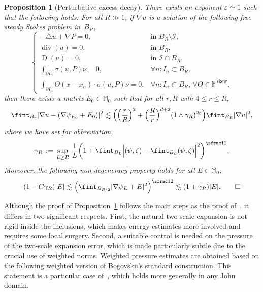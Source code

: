 \documentclass[10pt]{amsart}
\let\mathcal\mathscr
\theoremstyle{plain}
\newtheorem{propo}[theor]{Proposition}
\theoremstyle{definition}
\newcommand{\e}{\varepsilon}
\newcommand{\Ic}{\mathcal I}
\newcommand{\Md}{\mathbb M}
\newcommand{\D}{\operatorname{D}}
\newcommand{\Div}{{\operatorname{div}}}
\newcommand{\Skew}{{\operatorname{skew}}}
\begin{document}
\begin{propo}[Perturbative excess decay]\label{p1}
There exists an exponent $\e\simeq1$ such that the following holds:
For all $R\gg1$, if $\nabla u$ is a solution of the following free steady Stokes problem in~$B_R$,
\begin{equation}\label{eq:Stokes-zero}
\begin{cases}
-\triangle u+\nabla P=0,&\text{in $B_R\setminus\Ic$},\\
\Div(u)=0,&\text{in $B_R$},\\
\D(u)=0,&\text{in $\Ic\cap B_R$},\\
\int_{\partial I_n}\sigma(u,P)\nu=0,&\forall n:I_n \subset B_R,\\
\int_{\partial I_n}\Theta(x-x_n)\cdot\sigma(u,P)\nu=0,&\forall n:I_n \subset B_R,\,\forall\Theta\in\Md^\Skew,
\end{cases}
\end{equation}
then there exists a matrix $E_0\in\Md_0$
such that for all $r,R$ with $4\le r\le R$,
\begin{equation}\label{e.p1.1}
\fint_{B_r}|\nabla u-(\nabla\psi_{E_0}+E_0)|^2
\lesssim \Big(\Bigl(\frac{r}{R}\Bigr)^2+\Bigl(\frac{R}{r}\Bigr)^{d+2}(1\wedge\gamma_R)^{2\e}\Big)\fint_{B_R}|\nabla u|^2,
\end{equation}
where we have set for abbreviation,
\begin{equation}\label{e.p1.2}
\gamma_R \, :=\, \sup_{L\ge R}\,\frac{1}{L}\bigg(1+\fint_{B_L}\Big|(\psi,\zeta)-\fint_{B_L}(\psi,\zeta)\Big|^2\bigg)^{\sfrac12}.
\end{equation}
Moreover, the following non-degeneracy property holds for all $E\in\Md_0$,
\begin{equation}\label{e.p1.3}
(1-C\gamma_R) |E|\lesssim \Big(\fint_{B_{R/2}}|\nabla\psi_E+E|^2\Big)^{\sfrac12}\lesssim (1+\gamma_R)|E|.
\qedhere
\end{equation}
\end{propo}
Although the proof of Proposition~\ref{p1} follows the main steps as the proof of~\cite[Prop.\,1]{GNO-reg}, it differs in two
significant respects.
First, the natural two-scale expansion is not rigid inside the inclusions, which makes energy estimates more involved and requires some local surgery. Second, a suitable control is needed on the pressure of the two-scale expansion error, which is made particularly subtle due to the crucial use of weighted norms.
Weighted pressure estimates are obtained based on the following weighted version of Bogovskii's standard construction. This statement is a particular case of~\cite[Th.\,5.2]{DRS-10}, which holds more generally in any John domain.
\end{document}
